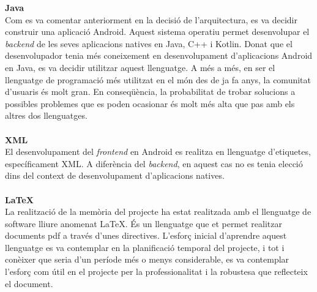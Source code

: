 \textbf{\large Java}\cite{java}\\
Com es va comentar anteriorment en la decisió de l'arquitectura, es va decidir construir una aplicació Android. Aquest sistema operatiu permet desenvolupar el \textit{backend} de les seves aplicacions natives en Java, C++ i Kotlin. Donat que el desenvolupador tenia més coneixement en desenvolupament d'aplicacions Android en Java, es va decidir utilitzar aquest llenguatge. A més a més, en ser el llenguatge de programació més utilitzat en el món des de ja fa anys, la comunitat d'usuaris és molt gran. En conseqüència, la probabilitat de trobar solucions a possibles problemes que es poden ocasionar és molt més alta que pas amb els altres dos llenguatges.
\\\\
\textbf{\large XML}\cite{xml}\\
El desenvolupament del \textit{frontend} en Android es realitza en llenguatge d'etiquetes, específicament XML. A diferència del \textit{backend}, en aquest cas no es tenia elecció dins del context de desenvolupament d'aplicacions natives.
\\\\
\textbf{\large \LaTeX}\cite{latex}\\
La realització de la memòria del projecte ha estat realitzada amb el llenguatge de software lliure anomenat \LaTeX. És un llenguatge que et permet realitzar documents pdf a través d'unes directives. L'esforç inicial d'aprendre aquest llenguatge es va contemplar en la planificació temporal del projecte, i tot i conèixer que seria d'un període més o menys considerable, es va contemplar l'esforç com útil en el projecte per la professionalitat i la robustesa que reflecteix el document.
\\\\
